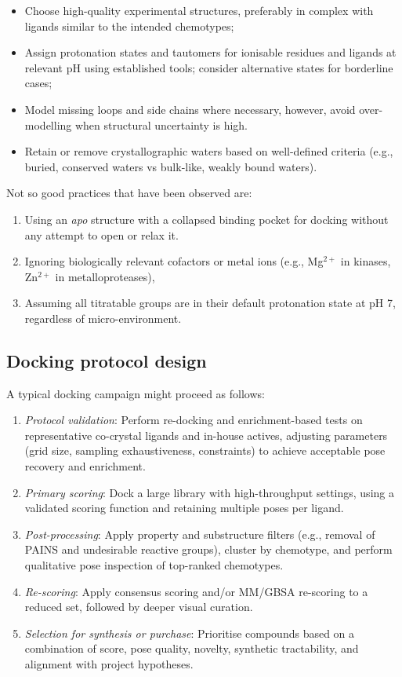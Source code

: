 \documentclass[12pt]{article}
\begin{document}
\begin{itemize}
  \item Choose high-quality experimental structures, preferably in complex with ligands similar to the intended chemotypes;
  \item Assign protonation states and tautomers for ionisable residues and ligands at relevant pH using established tools; consider alternative states for borderline cases;
  \item Model missing loops and side chains where necessary, however, avoid over-modelling when structural uncertainty is high.
  \item Retain or remove crystallographic waters based on well-defined criteria (e.g., buried, conserved waters vs bulk-like, weakly bound waters).
\end{itemize}

Not so good practices that have been observed are:

\begin{enumerate}
  \item Using an \emph{apo} structure with a collapsed binding pocket for docking without any attempt to open or relax it.
  \item Ignoring biologically relevant cofactors or metal ions (e.g., Mg$^{2+}$ in kinases, Zn$^{2+}$ in metalloproteases),
  \item Assuming all titratable groups are in their default protonation state at pH 7, regardless of micro-environment.
\end{enumerate}

\subsection{Docking protocol design}

A typical docking campaign might proceed as follows:

\begin{enumerate}
  \item \emph{Protocol validation}: Perform re-docking and enrichment-based tests on representative co-crystal ligands and in-house actives, adjusting parameters (grid size, sampling exhaustiveness, constraints) to achieve acceptable pose recovery and enrichment.
  \item \emph{Primary scoring}: Dock a large library with high-throughput settings, using a validated scoring function and retaining multiple poses per ligand.
  \item \emph{Post-processing}: Apply property and substructure filters (e.g., removal of PAINS and undesirable reactive groups), cluster by chemotype, and perform qualitative pose inspection of top-ranked chemotypes.
  \item \emph{Re-scoring}: Apply consensus scoring and/or MM/GBSA re-scoring to a reduced set, followed by deeper visual curation.
  \item \emph{Selection for synthesis or purchase}: Prioritise compounds based on a combination of score, pose quality, novelty, synthetic tractability, and alignment with project hypotheses.
\end{enumerate}
\end{document}
